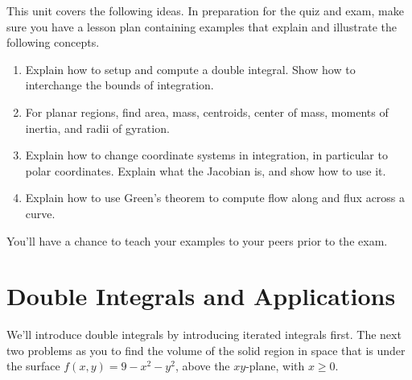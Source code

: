 
\noindent 
This unit covers the following ideas. In preparation for the quiz and exam, make sure you have a lesson plan containing examples that explain and illustrate the following concepts.  
\begin{enumerate}
\item Explain how to setup and compute a double integral. Show how to interchange the bounds of integration.
\item For planar regions, find area, mass, centroids, center of mass, moments of inertia, and radii of gyration.
\item Explain how to change coordinate systems in integration, in particular to polar coordinates. Explain what the Jacobian is, and show how to use it.
\item Explain how to use Green's theorem to compute flow along and flux across a curve.
\end{enumerate}
You'll have a chance to teach your examples to your peers prior to the exam.

\section{Double Integrals and Applications}

We'll introduce double integrals by introducing iterated integrals first. The next two problems as you to find the volume of the solid region in space that is under the surface $f(x,y) = 9-x^2-y^2$, above the $xy$-plane, with $x\geq 0$. 

